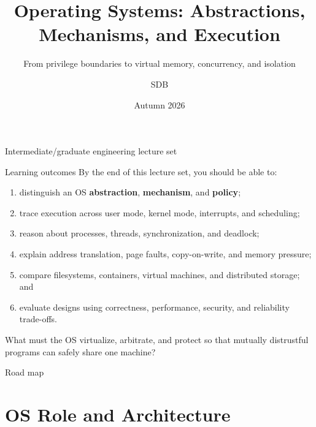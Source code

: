 \documentclass[aspectratio=169,11pt]{beamer}
\title[Operating Systems]{Operating Systems: Abstractions, Mechanisms, and Execution}
\subtitle{From privilege boundaries to virtual memory, concurrency, and isolation}
\author[SDB]{SDB}
\date{Autumn 2026}
\newcommand{\concept}[1]{\textcolor{osblue}{\textbf{#1}}}
\begin{document}
\begin{frame}
  \titlepage
  \vspace{-1.3em}
  \begin{center}
    \small Intermediate/graduate engineering lecture set
  \end{center}
\end{frame}

\begin{frame}{Learning outcomes}
  By the end of this lecture set, you should be able to:
  \begin{enumerate}
    \item distinguish an OS \concept{abstraction}, \concept{mechanism}, and \concept{policy};
    \item trace execution across user mode, kernel mode, interrupts, and scheduling;
    \item reason about processes, threads, synchronization, and deadlock;
    \item explain address translation, page faults, copy-on-write, and memory pressure;
    \item compare filesystems, containers, virtual machines, and distributed storage; and
    \item evaluate designs using correctness, performance, security, and reliability trade-offs.
  \end{enumerate}
  \begin{tcolorbox}[title=Guiding question,colback=osorange!5,colframe=osorange!70]
    What must the OS virtualize, arbitrate, and protect so that mutually distrustful programs can safely share one machine?
  \end{tcolorbox}
\end{frame}

\begin{frame}{Road map}
  \tableofcontents
\end{frame}

\section{OS Role and Architecture}
\end{document}
